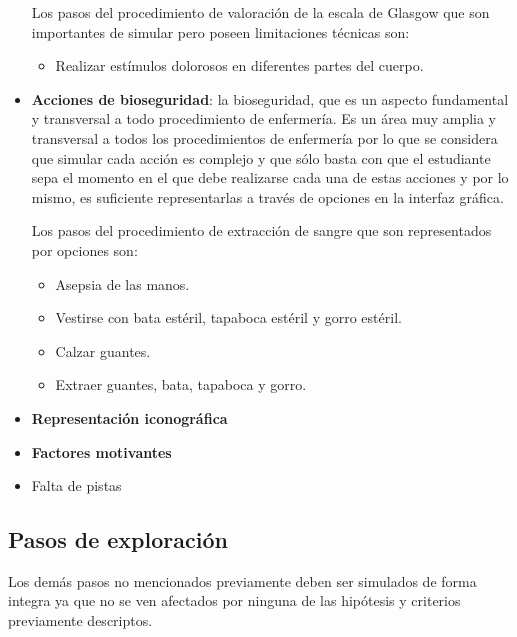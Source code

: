 \begin{itemize}
    Los pasos del procedimiento de valoración de la escala de Glasgow que son
    importantes de simular pero poseen limitaciones técnicas son:
    \begin{itemize} 
    \item Realizar estímulos dolorosos en diferentes partes del cuerpo. 
    \end{itemize}
    
\item 
    \textbf{Acciones de bioseguridad}: la bioseguridad, que es un aspecto
    fundamental y transversal a todo procedimiento de enfermería. Es un área muy
    amplia y transversal a todos los procedimientos de enfermería por lo que se
    considera que simular cada acción es complejo y que sólo basta con que el
    estudiante sepa el momento en el que debe realizarse cada una de estas
    acciones y por lo mismo, es suficiente representarlas a través de opciones
    en la interfaz gráfica.
    
    Los pasos del procedimiento de extracción de sangre que son representados
    por opciones son:
    \begin{itemize}
        \item Asepsia de las manos.
        \item Vestirse con bata estéril, tapaboca estéril y gorro estéril.
        \item Calzar guantes.
        \item Extraer guantes, bata, tapaboca y gorro.
    \end{itemize}
    
\item
    \textbf{Representación iconográfica}
\item 
    \textbf{Factores motivantes}

\item 
    Falta de pistas

\end{itemize}

\subsection{Pasos de exploración}

Los demás pasos no mencionados previamente deben ser simulados de forma 
integra ya que no se ven afectados por ninguna de las hipótesis y criterios previamente
descriptos.

